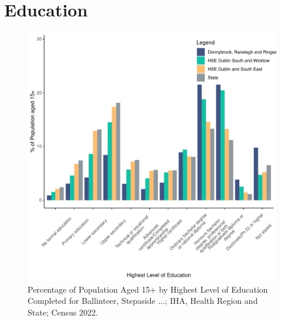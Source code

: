 \documentclass{article}
\begin{document}
\section{Education}\label{sect:Edu}
\begin{figure}[H]
	\centering
	\includegraphics[width = 120mm]{../figures/EduED.pdf}
	\caption{Percentage of Population Aged 15+ by Highest Level of Education Completed for Ballinteer, Stepaside ...; IHA, Health Region and State; Census 2022.}
	\label{fig:vbnv}
	\end{figure}
\end{document}
